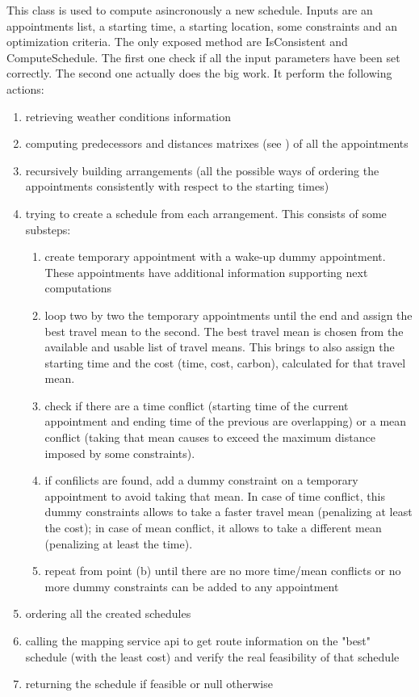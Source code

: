 This class is used to compute asincronously a new schedule. Inputs are an appointments list, a starting time, a starting location, some constraints and an optimization criteria. The only exposed method are IsConsistent and ComputeSchedule. The first one check if all the input parameters have been set correctly. The second one actually does the big work. It perform the following actions:
\begin{enumerate}
\item retrieving weather conditions information
\item computing predecessors and distances matrixes (see ) of all the appointments
\item recursively building arrangements (all the possible ways of ordering the  appointments consistently with respect to the starting times)
\item trying to create a schedule from each arrangement. This consists of some substeps:
\begin{enumerate}
\item create temporary appointment with a wake-up dummy appointment. These appointments have additional information supporting next computations
\item loop two by two the temporary appointments until the end and assign the best travel mean to the second. The best travel mean is chosen from the available and usable list of travel means. This brings to also assign the starting time and the cost (time, cost, carbon), calculated for that travel mean.
\item check if there are a time conflict (starting time of the current appointment and ending time of the previous are overlapping) or a mean conflict (taking that mean causes to exceed the maximum distance imposed by some constraints).
\item if confilicts are found, add a dummy constraint on a temporary appointment to avoid taking that mean. In case of time conflict, this dummy constraints allows to take a faster travel mean (penalizing at least the cost); in case of mean conflict, it allows to take a different mean (penalizing at least the time).
\item repeat from point (b) until there are no more time/mean conflicts or no more dummy constraints can be added to any appointment
\end{enumerate}

\item ordering all the created schedules
\item calling the mapping service api to get route information on the "best" schedule (with the least cost) and verify the real feasibility of that schedule
\item returning the schedule if feasible or null otherwise
\end{enumerate}










